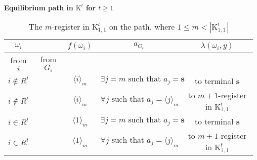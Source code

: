 \documentclass[12pt,letter]{article}
\newcommand{\Kappa}{\mathrm{K}}
\newcommand{\Omicron}{\mathrm{O}}
\theoremstyle{definition}
\theoremstyle{remark}
\theoremstyle{claim}
\begin{document}
\clearpage
\noindent \textbf{Equilibrium path in $\Kappa^t$ for $t\geq 1$}
\begin{table}[!htbp]
\caption{The $m$-register in $\Kappa^t_{1,1}$ on the path, where $1\leq m<|\Kappa^t_{1,1}|$}
\begin{center}
\begin{tabular}{c c | c | c | c}
$\omega_i$ 	 & 	   &	$f(\omega_i)$  &	$a_{G_i}$ & $\lambda(\omega_i,y)$ \\
\hline
\hline
from $i$ 	 & from $G_i$	  & 	&	 & \\
\hline
$i\notin R^t$  	& 						& $\langle i \rangle_m$		&  $\exists j=m\text{ such that } a_j=\textbf{s}$	& to terminal \textbf{s}\\
$i\notin R^t$  	& 						& $\langle i \rangle_m$		&  $\forall j\text{ such that } a_j= \langle j \rangle_m$	& to $m+1$-register in $\Kappa^t_{1,1}$\\
$i\in R^t$	 & 				& $\langle 1 \rangle_m$ 	& 	$\exists j=m\text{ such that } a_j=\textbf{s}$	& to terminal \textbf{s}\\
$i\in R^t$	 & 				& $\langle 1 \rangle_m$ 	& 	$\forall j\text{ such that } a_j= \langle j \rangle_m$ & to $m+1$-register in $\Kappa^t_{1,1}$\\
\hline
\end{tabular}
\end{center}
\end{table}
\end{document}
